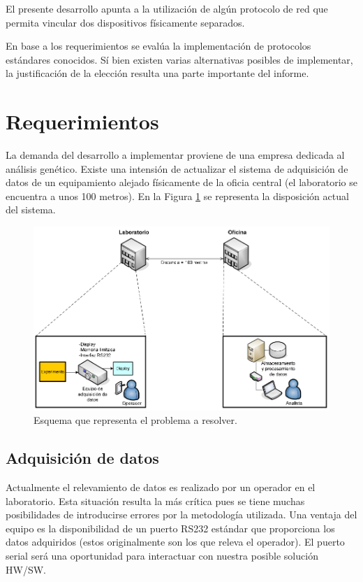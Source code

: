 \documentclass[11pt,oneside,spanish,a4paper]{article}
\begin{document}
El presente desarrollo apunta a la utilización de algún protocolo de
red que permita vincular dos dispositivos físicamente separados. 

En base a los requerimientos se evalúa la implementación de protocolos
estándares conocidos. Sí bien existen varias alternativas
posibles de implementar, la justificación de la elección resulta una
parte importante del informe. 

\section{Requerimientos}
\label{sec:req}

La demanda del desarrollo a implementar proviene de una empresa dedicada
al análisis genético. Existe una intensión de actualizar el sistema de
adquisición de datos de un equipamiento alejado físicamente de la
oficia central (el laboratorio se encuentra a unos 100 metros).  En la
Figura \ref{fig:sch} se representa la disposición actual del sistema.

\begin{figure}[ht]
  \centering
  \includegraphics[width=\textwidth]{img/sch-problem}
  \caption{Esquema que representa el problema a resolver.}
  \label{fig:sch}
\end{figure}

\subsection[Adquisición]{Adquisición de datos}
\label{sec:adq}

Actualmente el relevamiento de datos es realizado por un operador en
el laboratorio. Esta situación resulta la más crítica pues se tiene
muchas posibilidades de introducirse errores por la metodología
utilizada. Una ventaja del equipo es la disponibilidad de un puerto
RS232 estándar que proporciona los datos adquiridos (estos
originalmente son los que releva el operador). El puerto serial será
una oportunidad para interactuar con nuestra posible solución HW/SW.
\end{document}
